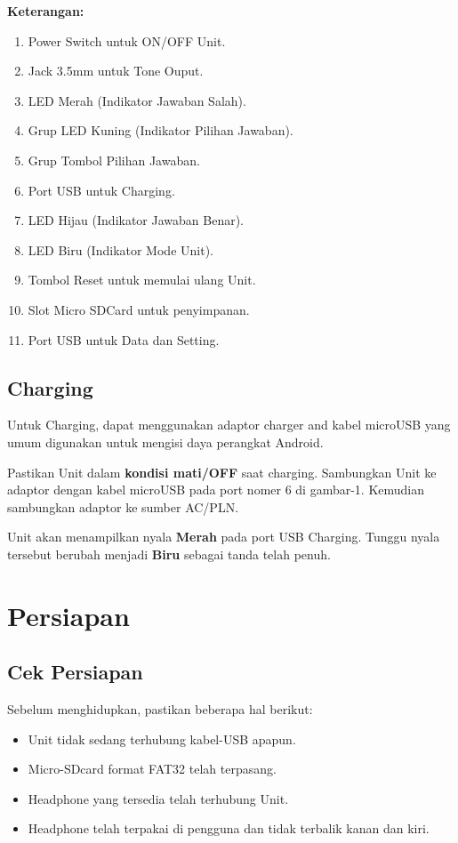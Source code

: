 \documentclass[12pt,]{article}
\begin{document}
	\newpage
	\textbf{Keterangan:}
	\begin{enumerate}
		\item Power Switch untuk ON/OFF Unit.
		\item Jack 3.5mm untuk Tone Ouput.
		\item LED Merah (Indikator Jawaban Salah).
		\item Grup LED Kuning (Indikator Pilihan Jawaban).
		\item Grup Tombol Pilihan Jawaban.
		\item Port USB untuk Charging.
		\item LED Hijau (Indikator Jawaban Benar).
		\item LED Biru (Indikator Mode Unit).
		\item Tombol Reset untuk memulai ulang Unit.
		\item Slot Micro SDCard untuk penyimpanan.
		\item Port USB untuk Data dan Setting.
	\end{enumerate}
	
	\subsection{Charging}
	
	Untuk Charging, dapat menggunakan adaptor charger and kabel microUSB yang umum digunakan untuk mengisi daya perangkat Android.
	
	Pastikan Unit dalam \textbf{kondisi mati/OFF} saat charging. 
	Sambungkan Unit ke adaptor dengan kabel microUSB pada port nomer 6 di gambar-1. Kemudian sambungkan adaptor ke sumber AC/PLN.
	
	Unit akan menampilkan nyala \textbf{Merah} pada port USB Charging.
	Tunggu nyala tersebut berubah menjadi \textbf{Biru} sebagai tanda telah penuh.
	
	\newpage
	\section{Persiapan}
	
	\subsection{Cek Persiapan}
	
	Sebelum menghidupkan, pastikan beberapa hal berikut:
	
	\begin{itemize}
		\item Unit tidak sedang terhubung kabel-USB apapun.
		\item Micro-SDcard format FAT32 telah terpasang.
		\item Headphone yang tersedia telah terhubung Unit.
		\item Headphone telah terpakai di pengguna dan tidak terbalik
		kanan dan kiri.
	\end{itemize}
\end{document}
